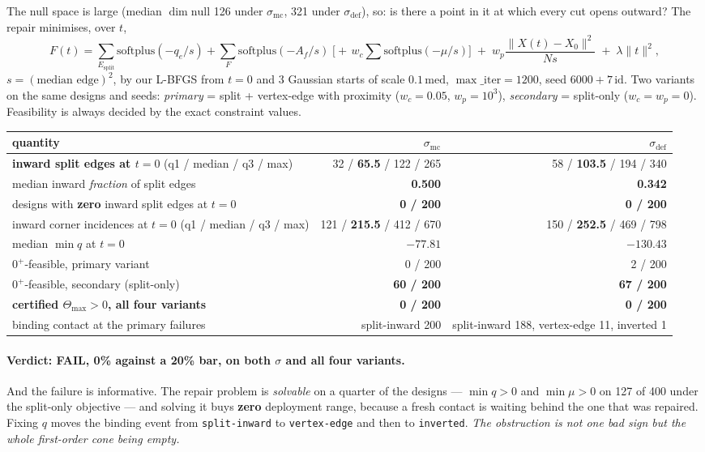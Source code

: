 \documentclass[11pt,a4paper]{article}
\theoremstyle{definition}
\newcommand{\Tmax}{\Theta_{\max}}
\newcommand{\Esplit}{E_{\mathrm{split}}}
\begin{document}
The null space is large (median $\dim\mathrm{null}$ 126 under $\sigma_{\mathrm{mc}}$, 321
under $\sigma_{\mathrm{def}}$), so: is there a point in it at which every cut opens outward?
The repair minimises, over $t$,
\begin{equation}
F(t) = \sum_{\Esplit}\mathrm{softplus}(-q_e/s) + \sum_{F}\mathrm{softplus}(-A_f/s)
\;\bigl[+\,w_c\sum\mathrm{softplus}(-\mu/s)\bigr]
\;+\; w_p\frac{\|X(t)-X_0\|^2}{Ns} \;+\; \lambda\|t\|^2 ,
\label{eq:k6obj}
\end{equation}
$s=(\text{median edge})^2$, by our L-BFGS from $t=0$ and 3 Gaussian starts of scale
$0.1\,\mathrm{med}$, $\max\_\mathrm{iter}=1200$, seed $6000+7\,\mathrm{id}$. Two variants on
the same designs and seeds: \emph{primary} = split + vertex-edge with proximity
($w_c=0.05$, $w_p=10^3$), \emph{secondary} = split-only ($w_c=w_p=0$). Feasibility is always
decided by the exact constraint values.

\begin{center}
\footnotesize
\begin{tabular}{@{}lrr@{}}
\toprule
quantity & $\sigma_{\mathrm{mc}}$ & $\sigma_{\mathrm{def}}$ \\
\midrule
\textbf{inward split edges at $t=0$} (q1 / median / q3 / max) & 32 / \textbf{65.5} / 122 / 265 & 58 / \textbf{103.5} / 194 / 340 \\
median inward \emph{fraction} of split edges & \textbf{0.500} & \textbf{0.342} \\
designs with \textbf{zero} inward split edges at $t=0$ & \textbf{0 / 200} & \textbf{0 / 200} \\
inward corner incidences at $t=0$ (q1 / median / q3 / max) & 121 / \textbf{215.5} / 412 / 670 & 150 / \textbf{252.5} / 469 / 798 \\
median $\min q$ at $t=0$ & $-77.81$ & $-130.43$ \\
$0^+$-feasible, primary variant & 0 / 200 & 2 / 200 \\
$0^+$-feasible, secondary (split-only) & \textbf{60 / 200} & \textbf{67 / 200} \\
\textbf{certified $\Tmax>0$, all four variants} & \textbf{0 / 200} & \textbf{0 / 200} \\
binding contact at the primary failures & split-inward 200 & split-inward 188, vertex-edge 11, inverted 1 \\
\bottomrule
\end{tabular}
\end{center}

\paragraph{Verdict: FAIL, 0\% against a 20\% bar, on both $\sigma$ and all four variants.}
And the failure is informative. The repair problem is \emph{solvable} on a quarter of the
designs --- $\min q>0$ and $\min\mu>0$ on 127 of 400 under the split-only objective --- and
solving it buys \textbf{zero} deployment range, because a fresh contact is waiting behind the
one that was repaired. Fixing $q$ moves the binding event from \texttt{split-inward} to
\texttt{vertex-edge} and then to \texttt{inverted}. \emph{The obstruction is not one bad sign
but the whole first-order cone being empty.}
\end{document}
